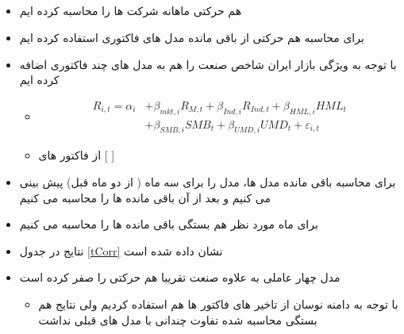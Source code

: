 \documentclass[12pt, a4paper]{article}
\begin{document}
  
  
\subsection{}
\label{comovement}
\begin{itemize}
	\item
	هم حرکتی ماهانه شرکت ها را محاسبه کرده ایم
	\item
	برای محاسبه هم حرکتی از باقی مانده مدل های فاکتوری استفاده کرده ایم
	\item
	با توجه به ویژگی بازار ایران شاخص صنعت را هم به مدل های چند فاکتوری اضافه کرده ایم

\begin{itemize}
	\item 
		\begin{equation}
		\begin{split}
			R_{i,t} =\alpha _{i}&+\beta _{mkt,i}{\mathit {R}}_{M,t} + \beta_{Ind,i}{\mathit {R}}_{Ind,t}+\beta _{HML,i}{\mathit {HML}}_{t} \\
			&+\beta _{SMB,i}{\mathit {SMB}}_{t}+\beta _{UMD,i}{\mathit {UMD}}_{t}+ \varepsilon_{i,t}
		\end{split}
		\label{e5Factor}
	\end{equation}
	\item
	از فاکتور های  [
	]
\end{itemize}
	
	\item
	برای محاسبه باقی مانده مدل ها، مدل را برای سه ماه ( از دو ماه قبل) پیش بینی می کنیم و بعد از آن باقی مانده ها را محاسبه می کنیم
	\item
	برای ماه مورد نظر هم بستگی باقی مانده ها را محاسبه می کنیم
	\item
	نتایج در جدول
	\ref{tCorr}
	نشان داده شده است
	\item
	مدل چهار عاملی به علاوه صنعت تقریبا هم حرکتی را صفر کرده است
	\begin{itemize}
		\item 
		با توجه به دامنه نوسان از تاخیر های فاکتور ها هم استفاده کردیم ولی نتایج  هم بستگی محاسبه شده تفاوت چندانی با مدل های قبلی نداشت
	\end{itemize}
	
\end{itemize}

     
\begin{LTR}
\end{LTR}
      
\end{document}

